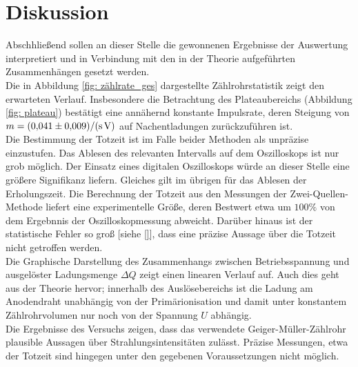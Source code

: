 \section{Diskussion}
Abschhließend sollen an dieser Stelle die gewonnenen Ergebnisse der Auswertung interpretiert und
in Verbindung mit den in der Theorie aufgeführten Zusammenhängen gesetzt werden.\\
Die in Abbildung \ref{fig: zählrate_ges} dargestellte Zählrohrstatistik zeigt den erwarteten Verlauf. Insbesondere
die Betrachtung des Plateaubereichs (Abbildung \ref{fig: plateau}) bestätigt eine annähernd konstante Impulsrate,
deren Steigung von $m = \SI{0.041 \pm 0.009}{\per\second\per\volt}$ auf Nachentladungen zurückzuführen ist.\\
Die Bestimmung der Totzeit ist im Falle beider Methoden als unpräzise einzustufen. Das Ablesen des relevanten
Intervalls auf dem Oszilloskops ist nur grob möglich. Der Einsatz eines digitalen Oszilloskops würde an dieser %
Stelle eine größere Signifikanz liefern. Gleiches gilt im übrigen für das Ablesen der Erholungszeit. %
Die Berechnung der Totzeit aus den Messungen der Zwei-Quellen-Methode liefert eine experimentelle Größe, deren Bestwert etwa um
$100\%$ von dem Ergebnnis der Oszilloskopmessung abweicht. Darüber hinaus ist der statistische Fehler so groß
[siehe \eqref{}], dass eine präzise Aussage über die Totzeit nicht getroffen werden.\\ %
Die Graphische Darstellung des Zusammenhangs zwischen Betriebsspannung und ausgelöster Ladungsmenge $\Delta Q$ zeigt
einen linearen Verlauf auf. Auch dies geht aus der Theorie hervor; innerhalb des Auslösebereichs ist die
Ladung am Anodendraht unabhängig von der Primärionisation und damit unter konstantem Zählrohrvolumen nur noch
von der Spannung $U$ abhängig. \\
Die Ergebnisse des Versuchs zeigen, dass das verwendete Geiger-Müller-Zählrohr plausible Aussagen über Strahlungsintensitäten
zulässt. Präzise Messungen, etwa der Totzeit sind hingegen unter den gegebenen Voraussetzungen nicht möglich.
